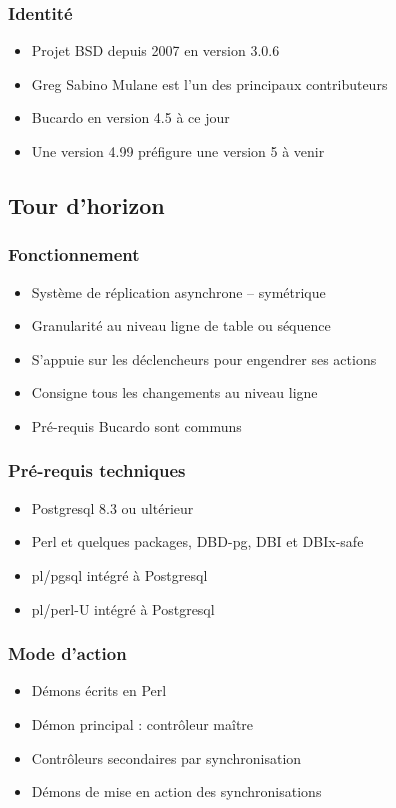 \documentclass[utf8]{beamer}
\begin{document}
\begin{frame}
  \frametitle{Identité}
  \begin{itemize}
  \item Projet BSD depuis 2007 en version 3.0.6
  \item Greg Sabino Mulane est l'un des principaux contributeurs
  \item Bucardo en version 4.5 à ce jour
  \item Une version 4.99 préfigure une version 5 à venir
  \end{itemize}
\end{frame}

\subsection{Tour d'horizon}


\begin{frame}
  \frametitle{Fonctionnement}

  \begin{itemize}
  \item Système de réplication asynchrone – symétrique
  \item Granularité au niveau ligne de table ou séquence
  \item S'appuie sur les déclencheurs pour engendrer ses actions
  \item Consigne tous les changements au niveau ligne
  \item Pré-requis Bucardo sont communs
  \end{itemize}
\end{frame}
  

\begin{frame}
  \frametitle{Pré-requis techniques}

  \begin{itemize}
  \item Postgresql 8.3 ou ultérieur
  \item Perl et quelques packages, DBD-pg, DBI et DBIx-safe
  \item pl/pgsql intégré à Postgresql
  \item pl/perl-U intégré à Postgresql
  \end{itemize}
\end{frame}

\begin{frame}
  \frametitle{Mode d'action}

  \begin{itemize}
  \item Démons écrits en Perl
  \item Démon principal : contrôleur maître
  \item Contrôleurs secondaires par synchronisation
  \item Démons de mise en action des synchronisations
  \end{itemize}
\end{frame}
\end{document}
